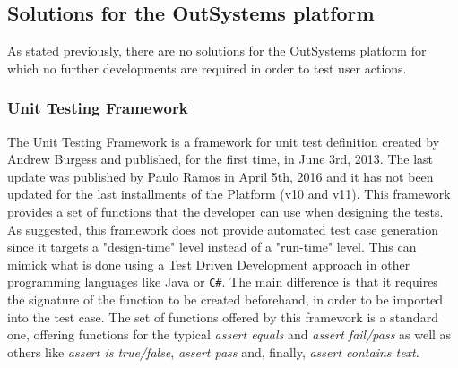 \documentclass{sigchi}
\begin{document}
\subsection{Solutions for the OutSystems platform}
As stated previously, there are no solutions for the OutSystems platform for which no further developments are required in order to test user actions.

\subsubsection{Unit Testing Framework}
The Unit Testing Framework is a framework for unit test definition created by Andrew Burgess and published, for the first time, in June 3rd, 2013. The last update was published by Paulo Ramos in April 5th, 2016 and it has not been updated for the last installments of the Platform (v10 and v11).
This framework provides a set of functions that the developer can use when designing the tests. As suggested, this framework does not provide automated test case generation since it targets a "design-time" level instead of a "run-time" level. This can mimick what is done using a Test Driven Development\cite{Astels:2003:TDD:864016} approach in other programming languages like Java or \texttt{C\#}. The main difference is that it requires the signature of the function to be created beforehand, in order to be imported into the test case.
The set of functions offered by this framework is a standard one, offering functions for the typical \textit{assert equals} and \textit{assert fail/pass} as well as others like \textit{assert is true/false}, \textit{assert pass} and, finally, \textit{assert contains text}.
\end{document}
